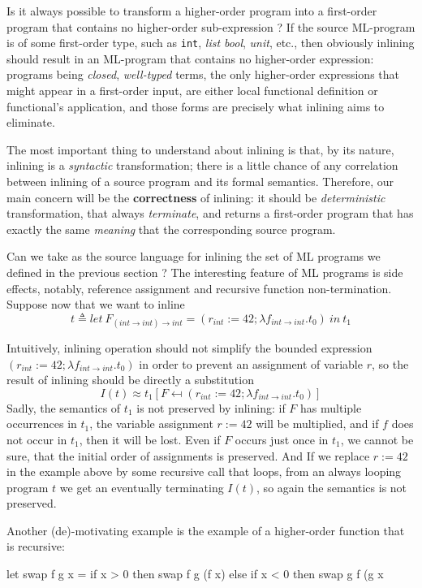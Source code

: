 \documentclass[a4paper,11pt,oneside]{article}
\theoremstyle{plain}
\newcommand{\tmlet}[3]{let~#1=#2~in~#3}
\newcommand{\tmsbst}[3]{#1 [#2 \mapsfrom #3] }
\begin{document}
Is it always possible to transform a higher-order program into a first-order program that contains no higher-order sub-expression ? If the source ML-program is of some first-order type,  such as \texttt{int}, \textit{list bool}, \textit{unit}, etc., then obviously inlining should result in an ML-program that contains no higher-order expression: programs being \textit{closed}, \textit{well-typed} terms, the only higher-order expressions that might appear in a first-order input, are either local functional definition or functional's application, and those forms are precisely what inlining aims to eliminate.  

The most important thing to understand about inlining is that, by its nature, inlining is a \textit{syntactic} transformation; there is a little chance of any correlation between inlining of a source program and its formal semantics. Therefore, our main concern will be the \textbf{correctness} of inlining: it  should be \textit{deterministic} transformation, that always \textit{terminate}, and returns a first-order program that has exactly the same \textit{meaning} that the corresponding source program. 

Can we take as the source language for inlining the set of ML programs we defined in the previous section ? The interesting feature of ML programs is side effects, notably, reference assignment and recursive function non-termination. Suppose now that we want to inline 
$$t \triangleq \tmlet{F_{(int \rightarrow int) \rightarrow int}}{(r_{int}:= 42; \lambda f_{int \rightarrow int}. t_0)}{t_1} $$


Intuitively, inlining operation should not simplify the bounded expression 
$(r_{int}:= 42; \lambda f_{int \rightarrow int}. t_0)$ in order to prevent an assignment of variable $r$, so the result of inlining should be directly a substitution 
$$ I(t) \approx \tmsbst{t_1}{F}{(r_{int}:= 42; \lambda f_{int \rightarrow int}. t_0)} $$
Sadly, the semantics of $t_1$ is not preserved by inlining:  
 if $F$ has multiple occurrences in $t_1$, the variable assignment $r:=42$ will be multiplied, and if $f$ does not occur in $t_1$, then it will be lost. Even if $F$ occurs just once in $t_1$, we cannot be sure, that the initial order of assignments is preserved. And If we replace $r:=42$ in the example above by some recursive call that loops, from an always looping program $t$ we get an eventually terminating $I(t)$, so again the semantics is not preserved.

Another (de)-motivating example is the example of a higher-order function that is recursive:
\begin{whycode}
let swap f g x = 
	if x > 0 then swap f g (f x) 
	else if x < 0 then swap g f (g x
\end{whycode}
%  
\end{document}

